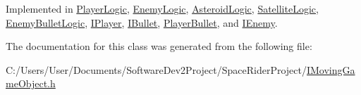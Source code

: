 Implemented in \hyperlink{class_player_logic_a765133271ba47a6fa9b2b45136f1fe73}{Player\+Logic}, \hyperlink{class_enemy_logic_a8dd48fa112c41249e46728d7ec8f820e}{Enemy\+Logic}, \hyperlink{class_asteroid_logic_a18e01f832db4f109799fc01c8c15efcd}{Asteroid\+Logic}, \hyperlink{class_satellite_logic_aa8f39f77a7783f8a97698ea750b34e94}{Satellite\+Logic}, \hyperlink{class_enemy_bullet_logic_a42d10bdfde42178e272997de9b387398}{Enemy\+Bullet\+Logic}, \hyperlink{class_i_player_a5b417cd92b4463e1c296a627430282b6}{I\+Player}, \hyperlink{class_i_bullet_ac1252496738126ec94a97512011b9112}{I\+Bullet}, \hyperlink{class_player_bullet_ab4e6b1485e9a63ddc00effc7532a9b09}{Player\+Bullet}, and \hyperlink{class_i_enemy_a3e44ca5e5fabcfd71b26657eba26e5a2}{I\+Enemy}.



The documentation for this class was generated from the following file\+:\begin{DoxyCompactItemize}
\item 
C\+:/\+Users/\+User/\+Documents/\+Software\+Dev2\+Project/\+Space\+Rider\+Project/\hyperlink{_i_moving_game_object_8h}{I\+Moving\+Game\+Object.\+h}\end{DoxyCompactItemize}
